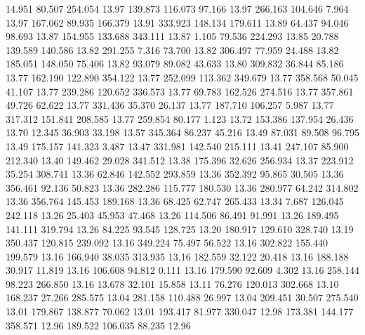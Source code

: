   14.951   80.507  254.054        13.97
 139.873  116.073   97.166        13.97
 266.163  104.646    7.964        13.97
 167.062   89.935  166.379        13.91
 333.923  148.134  179.611        13.89
  64.437   94.046   98.693        13.87
 154.955  133.688  343.111        13.87
   1.105   79.536  224.293        13.85
  20.788  139.589  140.586        13.82
 291.255    7.316   73.700        13.82
 306.497   77.959   24.488        13.82
 185.051  148.050   75.406        13.82
  93.079   89.082   43.633        13.80
 309.832   36.844   85.186        13.77
 162.190  122.890  354.122        13.77
 252.099  113.362  349.679        13.77
 358.568   50.045   41.107        13.77
 239.286  120.652  336.573        13.77
  69.783  162.526  274.516        13.77
 357.861   49.726   62.622        13.77
 331.436   35.370   26.137        13.77
 187.710  106.257    5.987        13.77
 317.312  151.841  208.585        13.77
 259.854   80.177    1.123        13.72
 153.386  137.954   26.436        13.70
  12.345   36.903   33.198        13.57
 345.364   86.237   45.216        13.49
  87.031   89.508   96.795        13.49
 175.157  141.323    3.487        13.47
 331.981  142.540  215.111        13.41
 247.107   85.900  212.340        13.40
 149.462   29.028  341.512        13.38
 175.396   32.626  256.934        13.37
 223.912   35.254  308.741        13.36
  62.846  142.552  293.859        13.36
 352.392   95.865   30.505        13.36
 356.461   92.136   50.823        13.36
 282.286  115.777  180.530        13.36
 280.977   64.242  314.802        13.36
 356.764  145.453  189.168        13.36
  68.425   62.747  265.433        13.34
   7.687  126.045  242.118        13.26
  25.403   45.953   47.468        13.26
 114.506   86.491   91.991        13.26
 189.495  141.111  319.794        13.26
  84.225   93.545  128.725        13.20
 180.917  129.610  328.740        13.19
 350.437  120.815  239.092        13.16
 349.224   75.497   56.522        13.16
 302.822  155.440  199.579        13.16
 166.940   38.035  313.935        13.16
 182.559   32.122   20.418        13.16
 188.188   30.917   11.819        13.16
 106.608   94.812    0.111        13.16
 179.590   92.609    4.302        13.16
 258.144   98.223  266.850        13.16
  13.678   32.101   15.858        13.11
  76.276  120.013  302.668        13.10
 168.237   27.266  285.575        13.04
 281.158  110.488   26.997        13.04
 209.451   30.507  275.540        13.01
 179.867  138.877   70.062        13.01
 193.417   81.977  330.047        12.98
 173.381  144.177  358.571        12.96
 189.522  106.035   88.235        12.96
